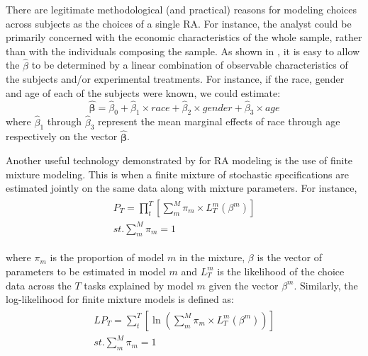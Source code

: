 \documentclass[../main.tex]{subfiles}
\begin{document}
There are legitimate methodological (and practical) reasons for modeling choices across subjects as the choices of a single RA.
For instance, the analyst could be primarily concerned with the economic characteristics of the whole sample, rather than with the individuals composing the sample.
As shown in \textcite[63]{Harrison2008}, it is easy to allow the $\hat{\beta}$ to be determined by a linear combination of observable characteristics of the subjects and/or experimental treatments.
For instance, if the race, gender and age of each of the subjects were known, we could estimate:
\begin{equation}
	\label{eq3:BB}
	\bm{\hat{\beta}} = \hat{\beta}_0 + \hat{\beta}_1 \times \mathit{race} + \hat{\beta}_2 \times \mathit{gender} + \hat{\beta}_3 \times \mathit{age}
\end{equation}
\noindent where $\hat{\beta}_1$ through $\hat{\beta}_3$ represent the mean marginal effects{\footnotemark} of race through age respectively on the vector $\bm{\hat{\beta}}$.

\addtocounter{footnote}{-1}


Another useful technology demonstrated by \textcite{Harrison2009} for RA modeling is the use of finite mixture modeling.
This is when a finite mixture of stochastic specifications are estimated jointly on the same data along with mixture parameters.
For instance,
\begin{align}
	\label{eq3:PT_Mix}
	\begin{split}
		\bm{\mathit{P_T}} = \prod_t^T \left[ \sum_m^M \pi_m \times L_T^m(\beta^m) \right]\\
		\mathit{st.} \sum_m^M \pi_m = 1
	\end{split}
\end{align}

\noindent where $\pi_m$ is the proportion of model $m$ in the mixture, $\beta$ is the vector of parameters to be estimated in model $m$ and $L_T^m$ is the likelihood of the choice data across the $T$ tasks explained by model $m$ given the vector $\beta^m$.
Similarly, the log-likelihood for finite mixture models is defined as:
\begin{align}
	\label{eq3:LPT_Mix}
	\begin{split}
		\bm{\mathit{LP_T}} = \sum_t^T \left[ \ln \left( \sum_m^M \pi_m \times L_T^m(\beta^m) \right) \right]\\
		\mathit{st.} \sum_m^M \pi_m = 1
	\end{split}
\end{align}
\end{document}

